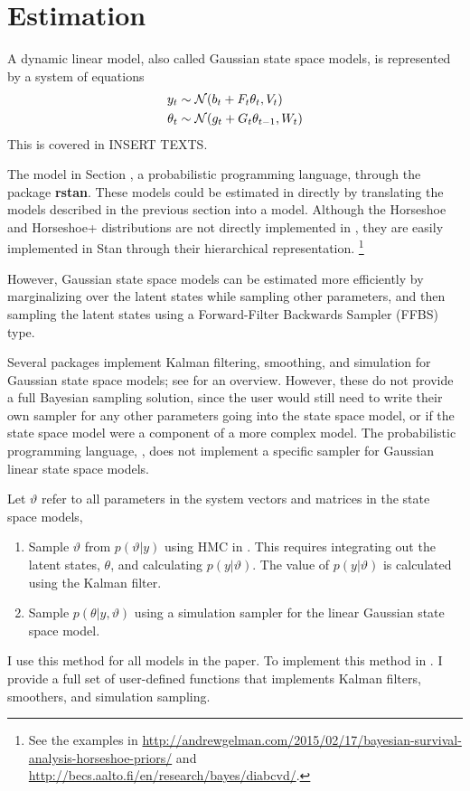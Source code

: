 \section{Estimation}
\label{dlm:sec:estimation}


A dynamic linear model, also called Gaussian state space models, is represented by a system of equations
\begin{equation}
  \label{dlm:eq:4}
  \begin{aligned}[t]
  y_{t} &\sim \mathcal{N}\mathopen{}\left(b_{t} + F_{t} \theta_{t}, V_{t}\right)\mathclose{} \\
  \theta_{t} &\sim \mathcal{N}\mathopen{}\left(g_{t} + G_{t} \theta_{t - 1}, W_{t}\right)\mathclose{} 
  \end{aligned}
\end{equation}
This is covered in INSERT TEXTS.

The model in Section \Stan{}, a probabilistic programming language, through the \RLang{} package \textbf{rstan}.
These models could be estimated in \Stan{} directly by translating the models described in the previous section into a \Stan{} model.
Although the Horseshoe and Horseshoe+ distributions are not directly implemented in \Stan{}, they are easily implemented in Stan through their hierarchical representation.%
\footnote{See the examples in \url{http://andrewgelman.com/2015/02/17/bayesian-survival-analysis-horseshoe-priors/} and \url{http://becs.aalto.fi/en/research/bayes/diabcvd/}.}

However, Gaussian state space models can be estimated more efficiently by marginalizing over the latent states while sampling other parameters, and then sampling the latent states using a Forward-Filter Backwards Sampler (FFBS) type.

Several \RLang{} packages implement Kalman filtering, smoothing, and simulation for Gaussian state space models; see \textcite{Tusell2011} for an overview.
However, these do not provide a full Bayesian sampling solution, since the user would still need to write their own sampler for any other parameters going into the state space model, or if the state space model were a component of a more complex model.
The  probabilistic programming language, , does not implement a specific sampler for Gaussian linear state space models.

Let $\vartheta$ refer to all parameters in the system vectors and matrices in the state space models,
\begin{enumerate}
\item Sample $\vartheta$ from $p(\vartheta | y)$ using HMC in \Stan{}.
  This requires integrating out the latent states, $\theta$, and calculating $p(y | \vartheta)$.
  The value of $p(y | \vartheta)$ is calculated using the Kalman filter.
\item Sample $p(\theta | y, \vartheta)$ using a simulation sampler for the linear Gaussian state space model.
\end{enumerate}
I use this method for all models in the paper. 
To implement this method in \Stan{}.
I provide a full set of user-defined \Stan{} functions that implements Kalman filters, smoothers, and simulation sampling.


